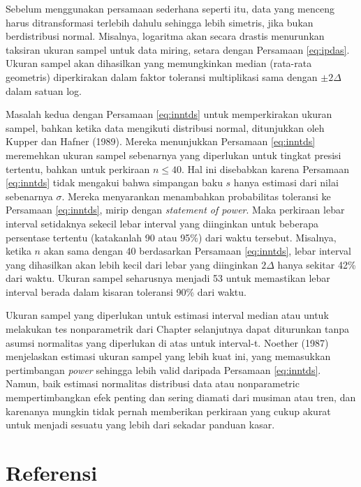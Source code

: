 \documentclass[]{book}
\begin{document}
Sebelum menggunakan persamaan sederhana seperti itu, data yang menceng
harus ditransformasi terlebih dahulu sehingga lebih simetris, jika bukan
berdistribusi normal. Misalnya, logaritma akan secara drastis menurunkan
taksiran ukuran sampel untuk data miring, setara dengan Persamaan
\eqref{eq:ipdas}. Ukuran sampel akan dihasilkan yang memungkinkan median
(rata-rata geometris) diperkirakan dalam faktor toleransi multiplikasi
sama dengan \(\pm2\Delta\)dalam satuan log.

Masalah kedua dengan Persamaan \eqref{eq:inntds} untuk memperkirakan
ukuran sampel, bahkan ketika data mengikuti distribusi normal,
ditunjukkan oleh Kupper dan Hafner (1989). Mereka menunjukkan Persamaan
\eqref{eq:inntds} meremehkan ukuran sampel sebenarnya yang diperlukan
untuk tingkat presisi tertentu, bahkan untuk perkiraan \(n\le40\). Hal
ini disebabkan karena Persamaan \eqref{eq:inntds} tidak mengakui bahwa
simpangan baku \(s\) hanya estimasi dari nilai sebenarnya \(\sigma\).
Mereka menyarankan menambahkan probabilitas toleransi ke Persamaan
\eqref{eq:inntds}, mirip dengan \emph{statement of power}. Maka perkiraan
lebar interval setidaknya sekecil lebar interval yang diinginkan untuk
beberapa persentase tertentu (katakanlah 90 atau 95\%) dari waktu
tersebut. Misalnya, ketika \(n\) akan sama dengan 40 berdasarkan
Persamaan \eqref{eq:inntds}, lebar interval yang dihasilkan akan lebih
kecil dari lebar yang diinginkan \(2\Delta\) hanya sekitar 42\% dari
waktu. Ukuran sampel seharusnya menjadi 53 untuk memastikan lebar
interval berada dalam kisaran toleransi 90\% dari waktu.

Ukuran sampel yang diperlukan untuk estimasi interval median atau untuk
melakukan tes nonparametrik dari Chapter selanjutnya dapat diturunkan
tanpa asumsi normalitas yang diperlukan di atas untuk interval-t.
Noether (1987) menjelaskan estimasi ukuran sampel yang lebih kuat ini,
yang memasukkan pertimbangan \emph{power} sehingga lebih valid daripada
Persamaan \eqref{eq:inntds}. Namun, baik estimasi normalitas distribusi
data atau nonparametric mempertimbangkan efek penting dan sering diamati
dari musiman atau tren, dan karenanya mungkin tidak pernah memberikan
perkiraan yang cukup akurat untuk menjadi sesuatu yang lebih dari
sekadar panduan kasar.

\section{Referensi}\label{referensi-9}
\end{document}
